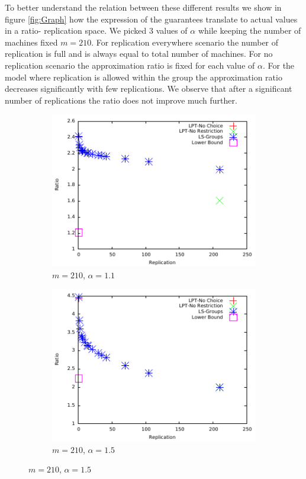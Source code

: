 \documentclass[10pt, conference, compsocconf]{IEEEtran}
\begin{document}
To better understand the relation between these different results we show in figure \ref{fig:Graph} how the expression of the guarantees translate to actual values in a ratio- replication space.  We picked 3 values of $\alpha$ while keeping the number of machines fixed $m=210$. For replication everywhere scenario the number of replication is full and is always equal to total number of machines.  For no replication scenario the approximation ratio is fixed for each value of $\alpha$.  For the model where replication is allowed within the group the approximation ratio decreases significantly with few replications. We observe that after a significant number of replications the ratio does not improve much further. 


\begin {figure}
\centering
\begin{subfigure}[b]{0.5\textwidth}
     \includegraphics[width=\textwidth]{alpha_11.pdf}
     \caption{$m=210$, $\alpha=1.1$}
      \label{fig:1}
\end {subfigure} %

\begin{subfigure}[b]{0.5\textwidth}
    \includegraphics[width=\textwidth]{alpha_15.pdf}
     \caption{$m=210$, $\alpha=1.5$}
      \label{fig:2}
\end {subfigure} %


\end{figure}
\end{document}
